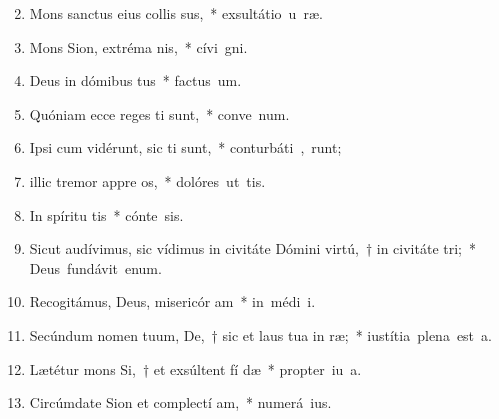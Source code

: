 \begin{flushleft}
\begin{enumerate}[leftmargin=*]
\setcounter{enumi}{1}

\item Mons sanctus eius collis sus,~* \mbox{exsultátio u ræ.}

\item Mons Sion, extréma nis,~* \mbox{cívi gni.}

\item Deus in dómibus  tus~* \mbox{factus um.}

\item Quóniam ecce reges ti sunt,~* \mbox{conve num.}

\item Ipsi cum vidérunt, sic ti sunt,~* \mbox{conturbáti , runt;}

\item illic tremor appre os,~* \mbox{dolóres ut tis.}

\item In spíritu tis~* \mbox{cónte sis.}

\item Sicut audívimus, sic vídimus in civitáte Dómini virtú,~† in civitáte  tri;~* \mbox{Deus fundávit enum.}

\item Recogitámus, Deus, misericór am~* \mbox{in médi i.}

\item Secúndum nomen tuum, De,~† sic et laus tua in  ræ;~* \mbox{iustítia plena est  a.}

\item Lætétur mons Si,~† et exsúltent fí dæ~* \mbox{propter iu a.}

\item Circúmdate Sion et complectí am,~* \mbox{numerá ius.}


\end{enumerate}
\end{flushleft}
